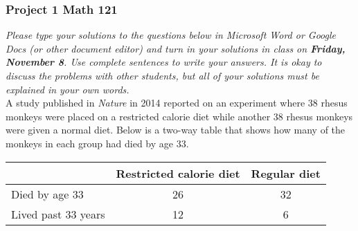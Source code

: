 \documentclass[12pt]{article}
\begin{document}
\subsubsection*{Project 1 \hfill Math 121}

\textit{Please type your solutions to the questions below in Microsoft Word or Google Docs (or other document editor) and turn in your solutions in class on \textbf{Friday, November 8}. Use complete sentences to write your answers.  It is okay to discuss the problems with other students, but all of your solutions must be explained in your own words. }  \\


A study published in \emph{Nature} in 2014 reported on an experiment where 38 rhesus monkeys were placed on a restricted calorie diet while another 38 rhesus monkeys were given a normal diet.  Below is a two-way table that shows how many of the monkeys in each group had died by age 33.

\begin{center}
\begin{tabular}{l|c|c}
~ & Restricted calorie diet & Regular diet \\ \hline
Died by age 33 & 26 & 32 \\
Lived past 33 years & 12 & 6 \\ 
\end{tabular}
\end{center}
\end{document}
